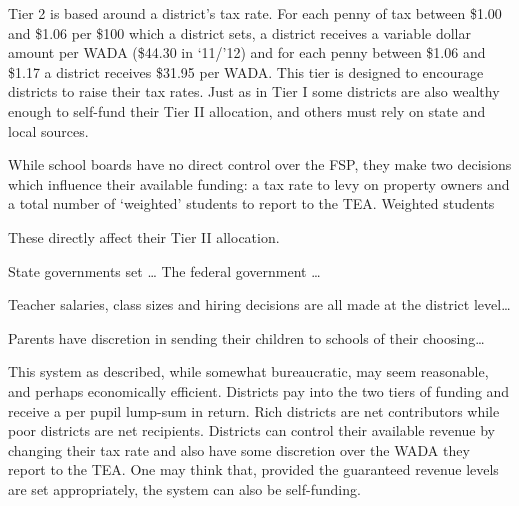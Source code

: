 \documentclass[11pt]{article}
\begin{document}
Tier 2 is based around a district’s tax rate. For each penny of tax between \$1.00 and \$1.06 per \$100 which a district sets, a district receives a variable dollar amount per WADA (\$44.30 in ‘11/’12) and for each penny between \$1.06 and \$1.17 a district receives \$31.95 per WADA. This tier is designed to encourage districts to raise their tax rates. Just as in Tier I some districts are also wealthy enough to self-fund their Tier II allocation, and others must rely on state and local sources.

While school boards have no direct control over the FSP, they make two decisions which influence their available funding: a tax rate to levy on property owners and a total number of ‘weighted’ students to report to the TEA. Weighted students 

These directly affect their Tier II allocation. 

State governments set … The federal government …

Teacher salaries, class sizes and hiring decisions are all made at the district level… 

Parents have discretion in sending their children to schools of their choosing… 

This system as described, while somewhat bureaucratic, may seem reasonable, and perhaps economically efficient. Districts pay into the two tiers of funding and receive a per pupil lump-sum in return. Rich districts are net contributors while poor districts are net recipients. Districts can control their available revenue by changing their tax rate and also have some discretion over the WADA they report to the TEA. One may think that, provided the guaranteed revenue levels are set appropriately, the system can also be self-funding. 
\end{document}
